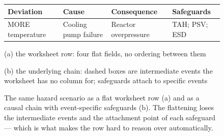 \begin{figure}[htbp]
\centering

{\small
\begin{tabular}{@{}llll@{}}
\toprule
\textbf{Deviation} & \textbf{Cause} & \textbf{Consequence} & \textbf{Safeguards} \\
\midrule
MORE temperature & Cooling pump failure & Reactor overpressure & TAH; PSV; ESD \\
\bottomrule
\end{tabular}}

\vspace{0.4em}
{\small (a) the worksheet row: four flat fields, no ordering between them}

\vspace{1.4em}


\vspace{0.4em}
{\small (b) the underlying chain: dashed boxes are intermediate events the\\ worksheet has no column for; safeguards attach to specific events}

\caption[Flat worksheet row versus the underlying causal chain]{The same
hazard scenario as a flat worksheet row (a) and as a causal chain with
event-specific safeguards (b). The flattening loses the intermediate events
and the attachment point of each safeguard --- which is what makes the row
hard to reason over automatically.}
\label{fig:flat-vs-chain}
\end{figure}

